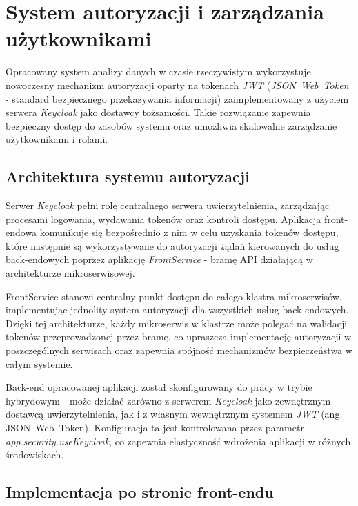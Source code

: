 \section{System autoryzacji i zarządzania użytkownikami}
\label{chap:autoryzacja}

Opracowany system analizy danych w czasie rzeczywistym wykorzystuje nowoczesny mechanizm autoryzacji oparty na tokenach \mbox{\textit{JWT}} (\mbox{\textit{JSON Web Token}} - standard bezpiecznego przekazywania informacji) zaimplementowany z użyciem serwera \textit{Keycloak} jako dostawcy tożsamości. Takie rozwiązanie zapewnia bezpieczny dostęp do zasobów systemu oraz umożliwia skalowalne zarządzanie użytkownikami i rolami.

\subsection{Architektura systemu autoryzacji}

Serwer \textit{Keycloak} pełni rolę centralnego serwera uwierzytelnienia, zarządzając procesami logowania, wydawania tokenów oraz kontroli dostępu. Aplikacja front-endowa komunikuje się bezpośrednio z nim w celu uzyskania tokenów dostępu, które następnie są wykorzystywane do autoryzacji żądań kierowanych do usług back-endowych poprzez aplikację \textit{FrontService} - bramę API działającą w architekturze mikroserwisowej.

FrontService stanowi centralny punkt dostępu do całego klastra mikroserwisów, implementując jednolity system autoryzacji dla wszystkich usług back-endowych. Dzięki tej architekturze, każdy mikroserwis w klastrze może polegać na walidacji tokenów przeprowadzonej przez bramę, co upraszcza implementację autoryzacji w poszczególnych serwisach oraz zapewnia spójność mechanizmów bezpieczeństwa w całym systemie.

Back-end opracowanej aplikacji został skonfigurowany do pracy w trybie hybrydowym - może działać zarówno z serwerem \textit{Keycloak} jako zewnętrznym dostawcą uwierzytelnienia, jak i z własnym wewnętrznym systemem \mbox{\textit{JWT}} (ang. \mbox{JSON Web Token}). Konfiguracja ta jest kontrolowana przez parametr \textit{app.security.useKeycloak}, co zapewnia elastyczność wdrożenia aplikacji w różnych środowiskach.

\subsection{Implementacja po stronie front-endu}

